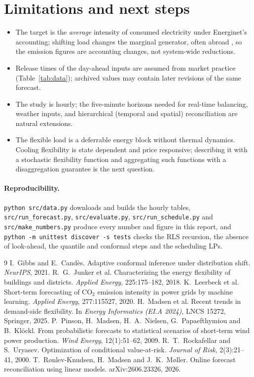 \documentclass[11pt,a4paper]{article}
\begin{document}
\section{Limitations and next steps}
\begin{itemize}
\item The target is the \emph{average} intensity of consumed electricity under Energinet's accounting; shifting load changes the marginal generator, often abroad \cite{leerbeck2020}, so the emission figures are accounting changes, not system-wide reductions.
\item Release times of the day-ahead inputs are assumed from market practice (Table~\ref{tab:data}); archived values may contain later revisions of the same forecast.
\item The study is hourly; the five-minute horizons needed for real-time balancing, weather inputs, and hierarchical (temporal and spatial) reconciliation \cite{ronlev2026} are natural extensions.
\item The flexible load is a deferrable energy block without thermal dynamics. Cooling flexibility is state dependent and price responsive; describing it with a stochastic flexibility function \cite{junker2018,madsen2025} and aggregating such functions with a disaggregation guarantee is the next question.
\end{itemize}

\paragraph{Reproducibility.} \texttt{python src/data.py} downloads and builds the hourly tables, \texttt{src/run\_forecast.py}, \texttt{src/evaluate.py}, \texttt{src/run\_schedule.py} and \texttt{src/make\_numbers.py} produce every number and figure in this report, and \texttt{python -m unittest discover -s tests} checks the RLS recursion, the absence of look-ahead, the quantile and conformal steps and the scheduling LPs.

\begin{thebibliography}{9}\small
{} I.~Gibbs and E.~Cand\`es. Adaptive conformal inference under distribution shift. \emph{NeurIPS}, 2021.
 R.~G.~Junker et al. Characterizing the energy flexibility of buildings and districts. \emph{Applied Energy}, 225:175--182, 2018.
 K.~Leerbeck et al. Short-term forecasting of CO$_2$ emission intensity in power grids by machine learning. \emph{Applied Energy}, 277:115527, 2020.
 H.~Madsen et al. Recent trends in demand-side flexibility. In \emph{Energy Informatics (EI.A 2024)}, LNCS 15272, Springer, 2025.
 P.~Pinson, H.~Madsen, H.~A.~Nielsen, G.~Papaefthymiou and B.~Kl\"ockl. From probabilistic forecasts to statistical scenarios of short-term wind power production. \emph{Wind Energy}, 12(1):51--62, 2009.
 R.~T.~Rockafellar and S.~Uryasev. Optimization of conditional value-at-risk. \emph{Journal of Risk}, 2(3):21--41, 2000.
 T.~R{\o}nlev-Knudsen, H.~Madsen and J.~K.~M{\o}ller. Online forecast reconciliation using linear models. arXiv:2606.23326, 2026.
\end{thebibliography}
\end{document}
